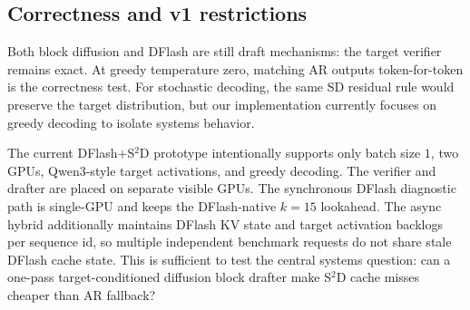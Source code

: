 \subsection{Correctness and v1 restrictions}

Both block diffusion and DFlash are still draft mechanisms: the target
verifier remains exact. At greedy temperature zero, matching AR outputs
token-for-token is the correctness test. For stochastic decoding, the same SD
residual rule would preserve the target distribution, but our implementation
currently focuses on greedy decoding to isolate systems behavior.

The current DFlash+S$^2$D prototype intentionally supports only batch size
$1$, two GPUs, Qwen3-style target activations, and greedy decoding. The
verifier and drafter are placed on separate visible GPUs. The synchronous
DFlash diagnostic path is single-GPU and keeps the DFlash-native $k=15$
lookahead. The async hybrid additionally maintains DFlash KV state and target
activation backlogs per sequence id, so multiple independent benchmark
requests do not share stale DFlash cache state. This is sufficient to test the
central systems question: can a one-pass target-conditioned diffusion block
drafter make S$^2$D cache misses cheaper than AR fallback?
